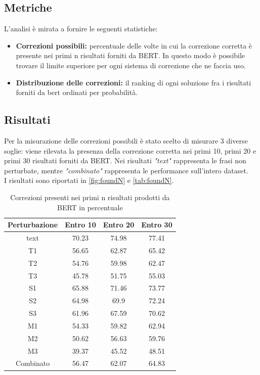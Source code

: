 \documentclass[12pt]{article}
\begin{document}
\subsection{Metriche}
L'analisi è mirata a fornire le seguenti statistiche:
\begin{itemize}
\item \textbf{Correzioni possibili:} percentuale delle volte in cui la correzione corretta è presente nei primi n risultati forniti da BERT. In questo modo è possibile trovare il limite superiore per ogni sistema di correzione che ne faccia uso.
\item \textbf{Distribuzione delle correzioni:} il ranking di ogni soluzione fra i risultati forniti da bert ordinati per probabilità.
\end{itemize}

\subsection{Risultati}
Per la misurazione delle correzioni possibili è stato scelto di misurare 3 diverse soglie: viene rilevata la presenza della correzione corretta nei primi 10, primi 20 e primi 30 risultati forniti da BERT. Nei risultati \textit{"text"} rappresenta le frasi non perturbate, mentre \textit{"combinato"} rappresenta le performance sull'intero dataset. \\
I risultati sono riportati in \autoref{fig:foundN} e \autoref{tab:foundN}.

\begin{table}[H]
\centering
\begin{tabular}{cccc}
\textbf{Perturbazione} & \textbf{Entro 10} & \textbf{Entro 20} & \textbf{Entro 30} \\ \hline
text& 70.23& 74.98& 77.41\\
T1& 56.65& 62.87& 65.42\\
T2& 54.76& 59.98& 62.47\\
T3& 45.78& 51.75& 55.03\\
S1& 65.88& 71.46& 73.77\\
S2& 64.98& 69.9& 72.24\\
S3& 61.96& 67.59& 70.62\\
M1& 54.33& 59.82& 62.94\\
M2& 50.62& 56.63& 59.76\\
M3& 39.37& 45.52& 48.51\\
Combinato& 56.47& 62.07& 64.83\\
\end{tabular}
\caption{Correzioni presenti nei primi n risultati prodotti da BERT in percentuale}
\label{tab:foundN}
\end{table}
\end{document}

